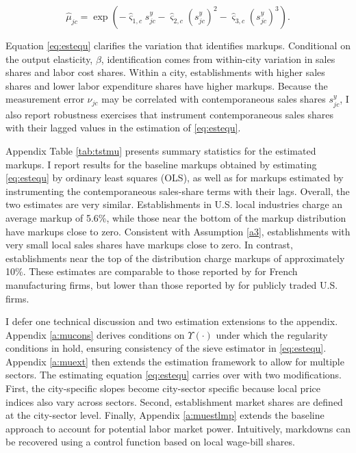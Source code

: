 \begin{equation}\label{eq:markupeq}
\hat{\mu}_{jc} = \exp(-\hat{\varsigma}_{1,c} s^y_{jc} - \hat{\varsigma}_{2,c} (s^y_{jc})^2 - \hat{\varsigma}_{3,c} (s^y_{jc})^3).
\end{equation}

Equation \eqref{eq:estequ} clarifies the variation that identifies markups. Conditional on the output elasticity, $\beta$, identification comes from within-city variation in sales shares and labor cost shares. Within a city, establishments with higher sales shares and lower labor expenditure shares have higher markups. Because the measurement error $\nu_{jc}$ may be correlated with contemporaneous sales shares $s^y_{jc}$, I also report robustness exercises that instrument contemporaneous sales shares with their lagged values in the estimation of \eqref{eq:estequ}.

Appendix Table \ref{tab:tstmu} presents summary statistics for the estimated markups. I report results for the baseline markups obtained by estimating \eqref{eq:estequ} by ordinary least squares (OLS), as well as for markups estimated by instrumenting the contemporaneous sales-share terms with their lags. Overall, the two estimates are very similar. Establishments in U.S. local industries charge an average markup of 5.6\%, while those near the bottom of the markup distribution have markups close to zero. Consistent with Assumption \ref{a3}, establishments with very small local sales shares have markups close to zero. In contrast, establishments near the top of the distribution charge markups of approximately 10\%. These estimates are comparable to those reported by \textcite{DeRidderGrassi&Morzenti24} for French manufacturing firms, but lower than those reported by \textcite{DeLoeckerEeckhout&Unger2019} for publicly traded U.S. firms.

I defer one technical discussion and two estimation extensions to the appendix. Appendix \ref{a:mucons} derives conditions on $\Upsilon(\cdot)$ under which the regularity conditions in \textcite{Newey97} hold, ensuring consistency of the sieve estimator in \eqref{eq:estequ}. Appendix \ref{a:muext} then extends the estimation framework to allow for multiple sectors. The estimating equation \eqref{eq:estequ} carries over with two modifications. First, the city-specific slopes become city-sector specific because local price indices also vary across sectors. Second, establishment market shares are defined at the city-sector level. Finally, Appendix \ref{a:muestlmp} extends the baseline approach to account for potential labor market power. Intuitively, markdowns can be recovered using a control function based on local wage-bill shares.

